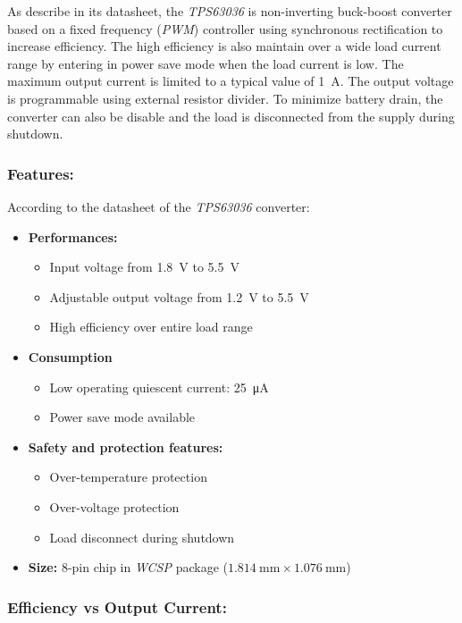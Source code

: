 \documentclass[report.tex]{subfiles}
\begin{document}
As describe in its datasheet, the \textit{TPS63036}\cite{TPS63036} is non-inverting buck-boost converter based on a fixed frequency (\textit{PWM}) controller using synchronous rectification to increase efficiency. The high efficiency is also maintain over a wide load current range by entering in power save mode when the load current is low. The maximum output current is limited to a typical value of \SI{1}{\ampere}. The output voltage is programmable using external resistor divider. To minimize battery drain, the converter can also be disable and the load is disconnected from the supply during shutdown.

\subsubsection{Features:}

According to the datasheet of the \textit{TPS63036}\cite{TPS63036} converter:
\begin{itemize}
\item \textbf{Performances:}
\begin{itemize}
	\item Input voltage from \SI{1.8}{\volt} to \SI{5.5}{\volt}
	\item Adjustable output voltage from \SI{1.2}{\volt} to \SI{5.5}{\volt}
	\item High efficiency over entire load range
\end{itemize}
\item \textbf{Consumption}
\begin{itemize}
	\item Low operating quiescent current: \SI{25}{\micro\ampere}
	\item Power save mode available
\end{itemize}
\item \textbf{Safety and protection features:}
\begin{itemize}
\item Over-temperature protection
\item Over-voltage protection
\item Load disconnect during shutdown
\end{itemize}
\item \textbf{Size:} 8-pin chip in \textit{WCSP} package ($\SI{1.814}{\milli\meter} \times \SI{1.076}{\milli\meter}$)
\end{itemize}

\subsubsection{Efficiency vs Output Current:}
\end{document}
